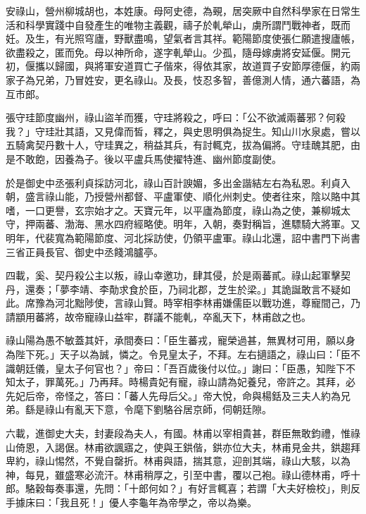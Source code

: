 
\begin{pinyinscope}

 安祿山，營州柳城胡也，本姓康。母阿史德，為覡，居突厥中自然科學家在日常生活和科學實踐中自發產生的唯物主義觀，禱子於軋犖山，虜所謂鬥戰神者，既而妊。及生，有光照穹廬，野獸盡鳴，望氣者言其祥。範陽節度使張仁願遣搜廬帳，欲盡殺之，匿而免。母以神所命，遂字軋犖山。少孤，隨母嫁虜將安延偃。開元初，偃攜以歸國，與將軍安道買亡子偕來，得依其家，故道買子安節厚德偃，約兩家子為兄弟，乃冒姓安，更名祿山。及長，忮忍多智，善億測人情，通六蕃語，為互市郎。



 張守珪節度幽州，祿山盜羊而獲，守珪將殺之，呼曰：「公不欲滅兩蕃邪？何殺我？」守珪壯其語，又見偉而皙，釋之，與史思明俱為捉生。知山川水泉處，嘗以五騎禽契丹數十人，守珪異之，稍益其兵，有討輒克，拔為偏將。守珪醜其肥，由是不敢飽，因養為子。後以平盧兵馬使擢特進、幽州節度副使。



 於是御史中丞張利貞採訪河北，祿山百計諛媚，多出金諧結左右為私恩。利貞入朝，盛言祿山能，乃授營州都督、平盧軍使、順化州刺史。使者往來，陰以賂中其嗜，一口更譽，玄宗始才之。天寶元年，以平廬為節度，祿山為之使，兼柳城太守，押兩蕃、渤海、黑水四府經略使。明年，入朝，奏對稱旨，進驃騎大將軍。又明年，代裴寬為範陽節度、河北採訪使，仍領平盧軍。祿山北還，詔中書門下尚書三省正員長官、御史中丞餞鴻臚亭。



 四載，奚、契丹殺公主以叛，祿山幸邀功，肆其侵，於是兩蕃貳。祿山起軍擊契丹，還奏；「夢李靖、李勣求食於臣，乃祠北郡，芝生於梁。」其詭誕敢言不疑如此。席豫為河北黜陟使，言祿山賢。時宰相李林甫嫌儒臣以戰功進，尊寵間己，乃請顓用蕃將，故帝寵祿山益牢，群議不能軋，卒亂天下，林甫啟之也。



 祿山陽為愚不敏蓋其奸，承間奏曰：「臣生蕃戎，寵榮過甚，無異材可用，願以身為陛下死。」天子以為誠，憐之。令見皇太子，不拜。左右擿語之，祿山曰：「臣不識朝廷儀，皇太子何官也？」帝曰：「吾百歲後付以位。」謝曰：「臣愚，知陛下不知太子，罪萬死。」乃再拜。時楊貴妃有寵，祿山請為妃養兒，帝許之。其拜，必先妃后帝，帝怪之，答曰：「蕃人先母后父。」帝大悅，命與楊銛及三夫人約為兄弟。繇是祿山有亂天下意，令麾下劉駱谷居京師，伺朝廷隙。



 六載，進御史大夫，封妻段為夫人，有國。林甫以宰相貴甚，群臣無敢鈞禮，惟祿山倚恩，入謁倨。林甫欲諷寤之，使與王鉷偕，鉷亦位大夫，林甫見金共，鉷趨拜卑約，祿山惕然，不覺自罄折。林甫與語，揣其意，迎剖其端，祿山大駭，以為神，每見，雖盛寒必流汗。林甫稍厚之，引至中書，覆以己袍。祿山德林甫，呼十郎。駱穀每奏事還，先問：「十郎何如？」有好言輒喜；若謂「大夫好檢校」，則反手據床曰：「我且死！」優人李龜年為帝學之，帝以為樂。




\end{pinyinscope}
